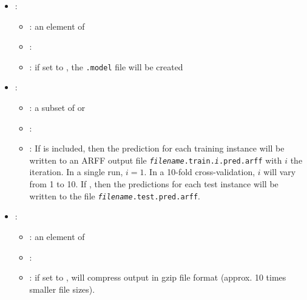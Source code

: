 \begin{itemize}
           \begin{itemize}
                \item \optionPossibleValues{}: ???
                \item \optionDefaultValue{}: 
                \item \optionDescrption{}: ???
           \end{itemize}
    \item {}:
           \begin{itemize}
                \item \optionPossibleValues{}: an element of 
                \item \optionDefaultValue{}: 
                \item \optionDescrption{}: if set to , the \texttt{.model} file will be created
           \end{itemize}
    \item {}:
           \begin{itemize}
                \item \optionPossibleValues{}: a subset of  or 
                \item \optionDefaultValue{}: 
                \item \optionDescrption{}: If  is included, then the prediction for each training instance will be written to an ARFF output file {\tt {\em filename}.train.{\em i}.pred.arff} with $i$ the iteration. In a single run, $i = 1$. In a 10-fold cross-validation, $i$ will vary from 1 to 10. If , then the predictions for each test instance will be written to the file
                {\tt {\em filename}.test.pred.arff}.
           \end{itemize}
    \item {}:
           \begin{itemize}
                \item \optionPossibleValues{}: an element of 
                \item \optionDefaultValue{}: 
                \item \optionDescrption{}:  if set to , \clus{} will compress output in gzip file format (approx. 10 times smaller file sizes).

\end{itemize}
\end{itemize}
